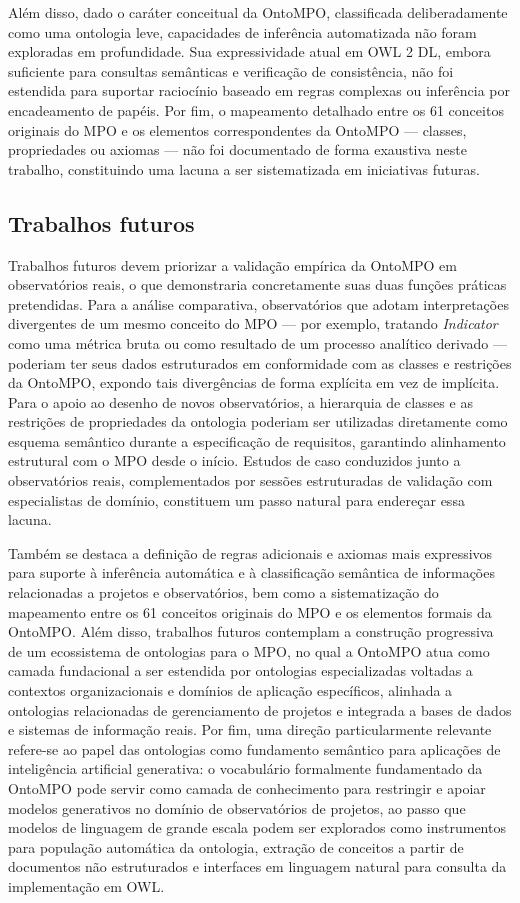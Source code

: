 Além disso, dado o caráter conceitual da OntoMPO, classificada
deliberadamente como uma ontologia leve, capacidades de inferência
automatizada não foram exploradas em profundidade. Sua expressividade
atual em OWL 2 DL, embora suficiente para consultas semânticas e
verificação de consistência, não foi estendida para suportar raciocínio
baseado em regras complexas ou inferência por encadeamento de papéis.
Por fim, o mapeamento detalhado entre os 61 conceitos originais do MPO e
os elementos correspondentes da OntoMPO --- classes, propriedades ou
axiomas --- não foi documentado de forma exaustiva neste trabalho,
constituindo uma lacuna a ser sistematizada em iniciativas futuras.

\subsection{Trabalhos futuros}

Trabalhos futuros devem priorizar a validação empírica da OntoMPO em
observatórios reais, o que demonstraria concretamente suas duas funções
práticas pretendidas. Para a análise comparativa, observatórios que
adotam interpretações divergentes de um mesmo conceito do MPO --- por
exemplo, tratando \textit{Indicator} como uma métrica bruta ou como
resultado de um processo analítico derivado --- poderiam ter seus dados
estruturados em conformidade com as classes e restrições da OntoMPO,
expondo tais divergências de forma explícita em vez de implícita. Para o
apoio ao desenho de novos observatórios, a hierarquia de classes e as
restrições de propriedades da ontologia poderiam ser utilizadas
diretamente como esquema semântico durante a especificação de
requisitos, garantindo alinhamento estrutural com o MPO desde o início.
Estudos de caso conduzidos junto a observatórios reais, complementados
por sessões estruturadas de validação com especialistas de domínio,
constituem um passo natural para endereçar essa lacuna.

Também se destaca a definição de regras adicionais e axiomas mais
expressivos para suporte à inferência automática e à classificação
semântica de informações relacionadas a projetos e observatórios, bem
como a sistematização do mapeamento entre os 61 conceitos originais do
MPO e os elementos formais da OntoMPO. Além disso, trabalhos futuros
contemplam a construção progressiva de um ecossistema de ontologias
para o MPO, no qual a OntoMPO atua como camada fundacional a ser
estendida por ontologias especializadas voltadas a contextos
organizacionais e domínios de aplicação específicos, alinhada a
ontologias relacionadas de gerenciamento de projetos e integrada a
bases de dados e sistemas de informação reais. Por fim, uma direção
particularmente relevante refere-se ao papel das ontologias como
fundamento semântico para aplicações de inteligência artificial
generativa: o vocabulário formalmente fundamentado da OntoMPO pode
servir como camada de conhecimento para restringir e apoiar modelos
generativos no domínio de observatórios de projetos, ao passo que
modelos de linguagem de grande escala podem ser explorados como
instrumentos para população automática da ontologia, extração de
conceitos a partir de documentos não estruturados e interfaces em
linguagem natural para consulta da implementação em OWL.